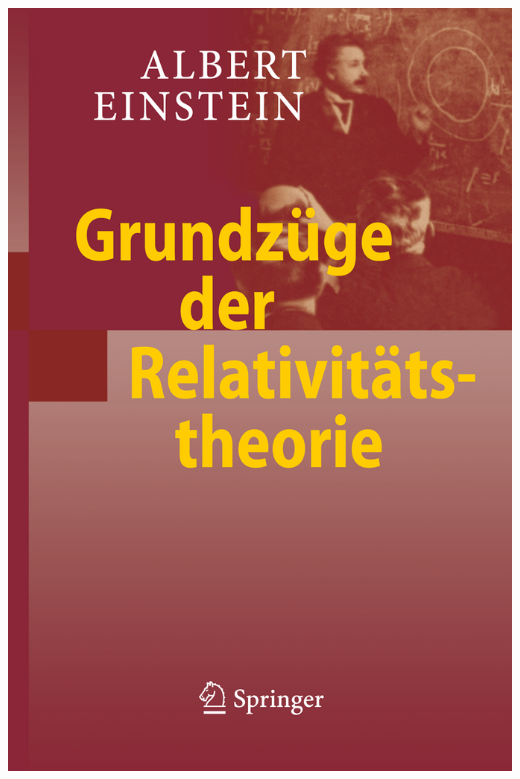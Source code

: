 %
%

\begin{titlepage}
\begin{center}
\includegraphics[]{./img/9783540878469.png}
\end{center}
\end{titlepage}

